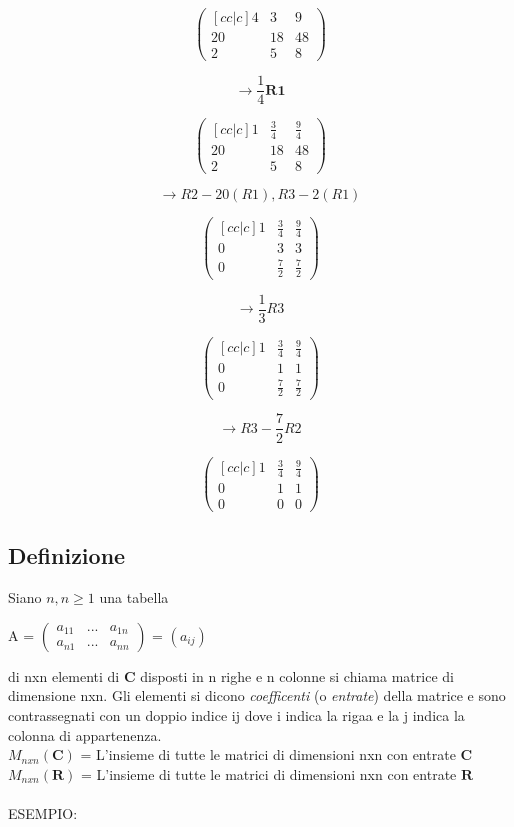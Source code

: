 \documentclass[12pt]{article}
\begin{document}
\[\begin{pmatrix}[cc|c]
  4 & 3 & 9\\
  20 & 18 & 48\\
  2 & 5 & 8
\end{pmatrix}\]

\[\rightarrow \frac{1}{4}\mathbf{R1}\]

\[\begin{pmatrix}[cc|c]
  1 & \frac{3}{4} & \frac{9}{4}\\
  20 & 18 & 48\\
  2 & 5 & 8
\end{pmatrix}\]

\[\rightarrow R2 - 20(R1), R3 - 2(R1)\]

\[\begin{pmatrix}[cc|c]
  1 & \frac{3}{4} & \frac{9}{4}\\
  0 & 3 & 3\\
  0 & \frac{7}{2} & \frac{7}{2}
\end{pmatrix}\]

\[\rightarrow \frac{1}{3}R3\]

\[\begin{pmatrix}[cc|c]
  1 & \frac{3}{4} & \frac{9}{4}\\
  0 & 1 & 1\\
  0 & \frac{7}{2} & \frac{7}{2}
\end{pmatrix}\]

\[\rightarrow R3 - \frac{7}{2}R2\]

\[\begin{pmatrix}[cc|c]
  1 & \frac{3}{4} & \frac{9}{4}\\
  0 & 1 & 1\\
  0 & 0 & 0
\end{pmatrix}\]

\subsection{Definizione}
Siano $n, n \ge 1$ una tabella

\begin{center}
A =
$\begin{pmatrix}
a_{11} & ... & a_{1n}\\
a_{n1} & ... & a_{nn}
\end{pmatrix}$ = $(a_{ij})$
\end{center}
di nxn elementi di $\mathbf{C}$ disposti in n righe e n colonne si chiama matrice di dimensione nxn. Gli elementi si dicono \textit{coefficenti} (o \textit{entrate}) della matrice e sono contrassegnati con un doppio indice ij dove i indica la rigaa e la j indica la colonna di appartenenza.\\
$M_{nxn}(\mathbf{C})$ = L'insieme di tutte le matrici di dimensioni nxn con entrate $\mathbf{C}$\\
$M_{nxn}(\mathbf{R})$ = L'insieme di tutte le matrici di dimensioni nxn con entrate $\mathbf{R}$\\
\\
ESEMPIO:
\end{document}
